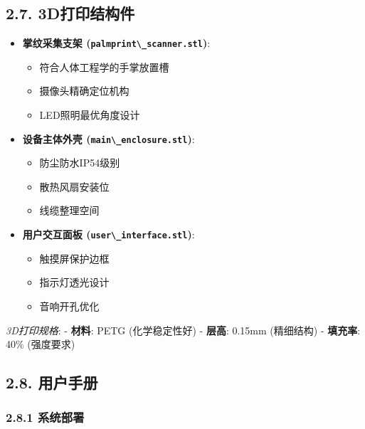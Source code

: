 \subsection{2.7. 3D打印结构件}\label{dux6253ux5370ux7ed3ux6784ux4ef6}

\begin{itemize}
\tightlist
\item
  \textbf{掌纹采集支架
  (\passthrough{\lstinline!palmprint\_scanner.stl!})}:

  \begin{itemize}
  \tightlist
  \item
    符合人体工程学的手掌放置槽
  \item
    摄像头精确定位机构
  \item
    LED照明最优角度设计
  \end{itemize}
\item
  \textbf{设备主体外壳 (\passthrough{\lstinline!main\_enclosure.stl!})}:

  \begin{itemize}
  \tightlist
  \item
    防尘防水IP54级别
  \item
    散热风扇安装位
  \item
    线缆整理空间
  \end{itemize}
\item
  \textbf{用户交互面板 (\passthrough{\lstinline!user\_interface.stl!})}:

  \begin{itemize}
  \tightlist
  \item
    触摸屏保护边框
  \item
    指示灯透光设计
  \item
    音响开孔优化
  \end{itemize}
\end{itemize}

\emph{3D打印规格}: - \textbf{材料}: PETG (化学稳定性好) - \textbf{层高}:
0.15mm (精细结构) - \textbf{填充率}: 40\% (强度要求)

\subsection{2.8. 用户手册}\label{ux7528ux6237ux624bux518c}

\subsubsection{2.8.1 系统部署}\label{ux7cfbux7edfux90e8ux7f72}

